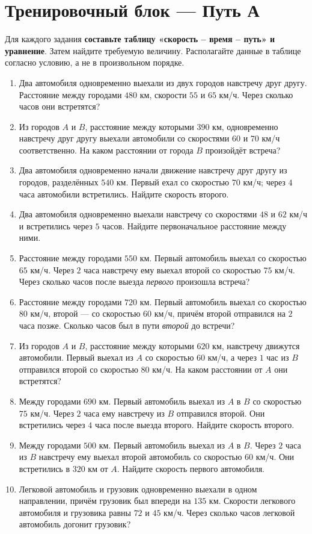\documentclass[a4paper,12pt]{article}
\newcommand{\sectionrule}{\par\vspace{3pt}{\color{accent}\hrule height .45pt}\vspace{9pt}}
\begin{document}
\section*{Тренировочный блок --- Путь А}
\sectionrule
Для каждого задания \textbf{составьте таблицу «скорость -- время -- путь» и уравнение}. Затем найдите требуемую величину. Располагайте данные в таблице согласно условию, а не в произвольном порядке.
\begin{enumerate}
\item Два автомобиля одновременно выехали из двух городов навстречу друг другу. Расстояние между городами $480$ км, скорости $55$ и $65$ км/ч. Через сколько часов они встретятся?
\item Из городов $A$ и $B$, расстояние между которыми $390$ км, одновременно навстречу друг другу выехали автомобили со скоростями $60$ и $70$ км/ч соответственно. На каком расстоянии от города $B$ произойдёт встреча?
\item Два автомобиля одновременно начали движение навстречу друг другу из городов, разделённых $540$ км. Первый ехал со скоростью $70$ км/ч; через $4$ часа автомобили встретились. Найдите скорость второго.
\item Два автомобиля одновременно выехали навстречу со скоростями $48$ и $62$ км/ч и встретились через $5$ часов. Найдите первоначальное расстояние между ними.
\item Расстояние между городами $550$ км. Первый автомобиль выехал со скоростью $65$ км/ч. Через $2$ часа навстречу ему выехал второй со скоростью $75$ км/ч. Через сколько часов после выезда \emph{первого} произошла встреча?
\item Расстояние между городами $720$ км. Первый автомобиль выехал со скоростью $80$ км/ч, второй --- со скоростью $60$ км/ч, причём второй отправился на $2$ часа позже. Сколько часов был в пути \emph{второй} до встречи?
\item Из городов $A$ и $B$, расстояние между которыми $620$ км, навстречу движутся автомобили. Первый выехал из $A$ со скоростью $60$ км/ч, а через $1$ час из $B$ отправился второй со скоростью $80$ км/ч. На каком расстоянии от $A$ они встретятся?
\item Между городами $690$ км. Первый автомобиль выехал из $A$ в $B$ со скоростью $75$ км/ч. Через $2$ часа ему навстречу из $B$ отправился второй. Они встретились через $4$ часа после выезда второго. Найдите скорость второго.
\item Между городами $500$ км. Первый автомобиль выехал из $A$ в $B$. Через $2$ часа из $B$ навстречу ему выехал второй автомобиль со скоростью $60$ км/ч. Они встретились в $320$ км от $A$. Найдите скорость первого автомобиля.
\item Легковой автомобиль и грузовик одновременно выехали в одном направлении, причём грузовик был впереди на $135$ км. Скорости легкового автомобиля и грузовика равны $72$ и $45$ км/ч. Через сколько часов легковой автомобиль догонит грузовик?
\end{enumerate}
\end{document}
